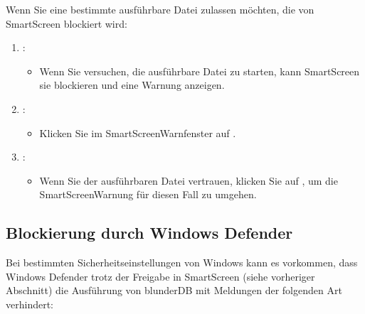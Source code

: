 \documentclass[letterpaper,10pt,german]{sphinxmanual}
\begin{document}
\sphinxAtStartPar
Wenn Sie eine bestimmte ausführbare Datei zulassen möchten, die von SmartScreen blockiert wird:
\begin{enumerate}
%
\item {} 
\sphinxAtStartPar
{}:
\begin{itemize}
\item {} 
\sphinxAtStartPar
Wenn Sie versuchen, die ausführbare Datei zu starten, kann SmartScreen sie blockieren und eine Warnung anzeigen.

\end{itemize}

\item {} 
\sphinxAtStartPar
{}:
\begin{itemize}
\item {} 
\sphinxAtStartPar
Klicken Sie im SmartScreen\sphinxhyphen{}Warnfenster auf .

\end{itemize}

\item {} 
\sphinxAtStartPar
{}:
\begin{itemize}
\item {} 
\sphinxAtStartPar
Wenn Sie der ausführbaren Datei vertrauen, klicken Sie auf , um die SmartScreen\sphinxhyphen{}Warnung für diesen Fall zu umgehen.

\end{itemize}

\end{enumerate}


\subsection{Blockierung durch Windows Defender}
\label{\detokenize{annexe_windows_securite:blocage-windows-defender}}
\sphinxAtStartPar
Bei bestimmten Sicherheitseinstellungen von Windows kann es vorkommen, dass Windows Defender trotz der Freigabe in SmartScreen (siehe vorheriger Abschnitt) die Ausführung von blunderDB mit Meldungen der folgenden Art verhindert:

\begin{figure}[htbp]
\centering

\noindent{}
\end{figure}
\end{document}

